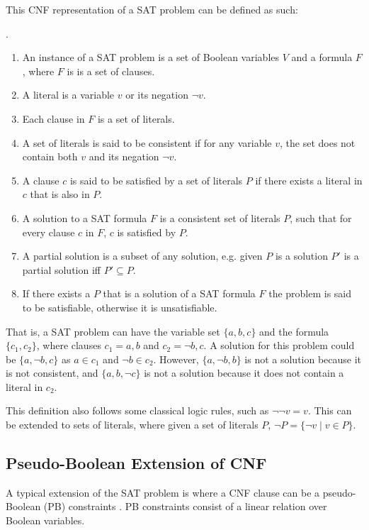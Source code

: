 This CNF representation of a SAT problem can be defined as such:
\begin{defs}
\label{impl.defSAT}
.
\begin{enumerate}
	\item An instance of a SAT problem is a set of Boolean variables $V$ and a formula $F$, where $F$ is is a set of clauses.
	\item A literal is a variable $v$ or its negation $\neg v$.
	\item Each clause in $F$ is a set of literals. \label{impl.whatisaclause}
	\item A set of literals is said to be consistent if for any variable $v$, the set does not contain both $v$ and its negation $\neg v$.
	\item A clause $c$ is said to be satisfied by a set of literals $P$ if there exists a literal in $c$ that is also in $P$.
	\item A solution to a SAT formula $F$ is a consistent set of literals $P$, such that for every clause $c$ in $F$, $c$ is satisfied by $P$.
	\item A partial solution is a subset of any solution, e.g. given $P$ is a solution $P'$ is a partial solution iff $P' \subseteq P$.
	\item If there exists a $P$ that is a solution of a SAT formula $F$ the problem is said to be satisfiable, otherwise it is unsatisfiable. 
\end{enumerate}
\end{defs}

That is, a SAT problem can have the variable set $\{a,b,c\}$ and the formula $\{c_1,c_2\}$, where clauses $c_1 = {a,b}$ and $c_2 = {\neg b, c}$.
A solution for this problem could be $\{a,\neg b,c\}$ as $a \in c_1$ and $\neg b \in c_2$.
However, $\{a, \neg b, b\}$ is not a solution because it is not consistent, and $\{a, b, \neg c\}$ is not a solution because it does not contain a literal in $c_2$.  

This definition also follows some classical logic rules, such as $\neg \neg v = v$.
This can be extended to sets of literals,
where given a set of literals $P$, $\neg P = \{\neg v \mid v \in P\}$.

\subsection{Pseudo-Boolean Extension of CNF}
A typical extension of the SAT problem is where a CNF clause can be a pseudo-Boolean (PB) constraints \citep{dixon2004automating}.
PB constraints consist of a linear relation over Boolean variables.

